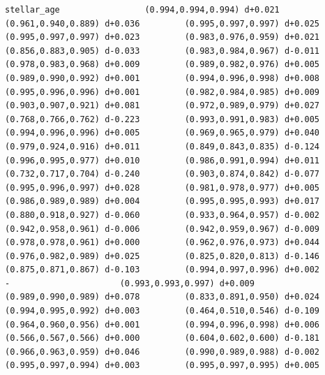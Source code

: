 \documentclass[11pt, letterpaper, openany]{book}
\begin{document}
\begin{empiricalbox}
\begin{lstlisting}[style=terminal]
stellar_age                 (0.994,0.994,0.994) d+0.021         (0.961,0.940,0.889) d+0.036         (0.995,0.997,0.997) d+0.025         (0.995,0.997,0.997) d+0.023         (0.983,0.976,0.959) d+0.021         (0.856,0.883,0.905) d-0.033         (0.983,0.984,0.967) d-0.011         (0.978,0.983,0.968) d+0.009         (0.989,0.982,0.976) d+0.005         (0.989,0.990,0.992) d+0.001         (0.994,0.996,0.998) d+0.008         (0.995,0.996,0.996) d+0.001         (0.982,0.984,0.985) d+0.009         (0.903,0.907,0.921) d+0.081         (0.972,0.989,0.979) d+0.027         (0.768,0.766,0.762) d-0.223         (0.993,0.991,0.983) d+0.005         (0.994,0.996,0.996) d+0.005         (0.969,0.965,0.979) d+0.040         (0.979,0.924,0.916) d+0.011         (0.849,0.843,0.835) d-0.124         (0.996,0.995,0.977) d+0.010         (0.986,0.991,0.994) d+0.011         (0.732,0.717,0.704) d-0.240         (0.903,0.874,0.842) d-0.077         (0.995,0.996,0.997) d+0.028         (0.981,0.978,0.977) d+0.005         (0.986,0.989,0.989) d+0.004         (0.995,0.995,0.993) d+0.017         (0.880,0.918,0.927) d-0.060         (0.933,0.964,0.957) d-0.002         (0.942,0.958,0.961) d-0.006         (0.942,0.959,0.967) d-0.009         (0.978,0.978,0.961) d+0.000         (0.962,0.976,0.973) d+0.044         (0.976,0.982,0.989) d+0.025         (0.825,0.820,0.813) d-0.146         (0.875,0.871,0.867) d-0.103         (0.994,0.997,0.996) d+0.002                      -                      (0.993,0.993,0.997) d+0.009         (0.989,0.990,0.989) d+0.078         (0.833,0.891,0.950) d+0.024         (0.994,0.995,0.992) d+0.003         (0.464,0.510,0.546) d-0.109         (0.964,0.960,0.956) d+0.001         (0.994,0.996,0.998) d+0.006         (0.566,0.567,0.566) d+0.000         (0.604,0.602,0.600) d-0.181         (0.966,0.963,0.959) d+0.046         (0.990,0.989,0.988) d-0.002         (0.995,0.997,0.994) d+0.003         (0.995,0.997,0.995) d+0.005     

\end{lstlisting}
\end{empiricalbox}
\end{document}
